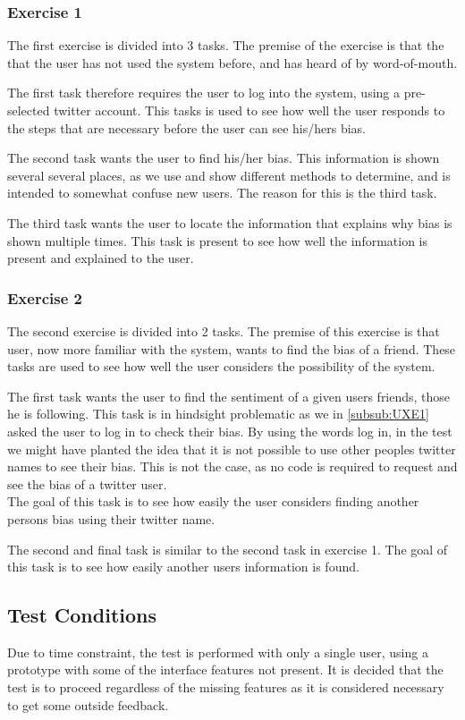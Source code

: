 \subsubsection{Exercise 1}\label{subsub:UXE1}
The first exercise is divided into 3 tasks. The premise of the exercise is that
the that the user has not used the system before, and has heard of by
word-of-mouth.\nl

The first task therefore requires the user to log into the system, using a
pre-selected twitter account. This tasks is used to see how well the user
responds to the steps that are necessary before the user can see his/hers
bias.\nl

The second task wants the user to find his/her bias. This information is shown
several several places, as we use and show different methods to determine, and
is intended to somewhat confuse new users. The reason for this is the third
task.\nl

The third task wants the user to locate the information that explains why bias
is shown multiple times. This task is present to see how well the information
is present and explained to the user.

\subsubsection{Exercise 2}
The second exercise is divided into 2 tasks. The premise of this exercise is
that user, now more familiar with the system, wants to find the bias of a
friend. These tasks are used to see how well the user considers the possibility
of the system.\nl

The first task wants the user to find the sentiment of a given users
friends, those he is following. This task is in hindsight problematic as we in
\autoref{subsub:UXE1} asked the user to log in to check their bias. By using
the words log in, in the test we might have planted the idea that it is not
possible to use other peoples twitter names to see their bias. This is not the
case, as no code is required to request and see the bias of a twitter user.\\
The goal of this task is to see how easily the user considers finding
another persons bias using their twitter name.\nl

The second and final task is similar to the second task in exercise 1. The goal
of this task is to see how easily another users information is found.

\subsection{Test Conditions}
Due to time constraint, the test is performed with only a single user,
using a prototype with some of the interface features not present. It is
decided that the test is to proceed regardless of the missing features as it
is considered necessary to get some outside feedback.\nl

